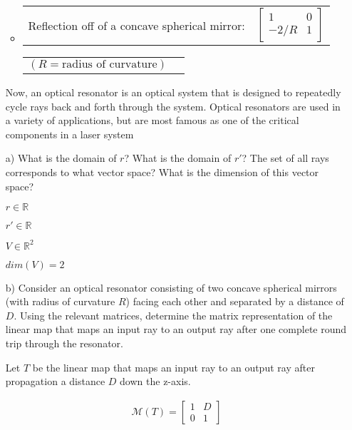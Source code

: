 \documentclass[fleqn]{article}
\begin{document}
\begin{enumerate}[nolistsep]
\begin{itemize}
				\item
					\begin{tabularx}{0.85\textwidth}{>{\hsize=0.75\hsize}X  >{\hsize=0.25\hsize}X}
						Reflection off of a concave spherical mirror: & $\begin{bmatrix}
							 1   & 0\\
							-2/R & 1
							\end{bmatrix}$
					\end{tabularx}
					
					\begin{tabularx}{0.85\textwidth}{>{\hsize=0.75\hsize}X  >{\hsize=0.25\hsize}X}
						$(R = \text{radius of curvature})$ &\\						
					\end{tabularx}
			\end{itemize}
			\endgroup
				
			Now, an optical resonator is an optical system that is designed to repeatedly cycle rays back and forth through the system. Optical resonators are used in a variety of applications, but are most famous as one of the critical components in a laser system
			
			\item[a)] What is the domain of $r$? What is the domain of $r'$? The set of all rays corresponds to what vector space? What is the dimension of this vector space?
			
			$r \in \mathbb{R}$
			
			$r' \in \mathbb{R}$
			
			$V \in \mathbb{R}^2$
			
			$dim(V) = 2$
			
			\item[b)] Consider an optical resonator consisting of two concave spherical mirrors (with radius of curvature $R$) facing each other and separated by a distance of $D$. Using the relevant matrices, determine the matrix representation of the linear map that maps an input ray to an output ray after one complete round trip through the resonator.
			
			\pagebreak
			Let $T$ be the linear map that maps an input ray to an output ray after propagation a distance $D$ down the z-axis.
			
			\begin{align*}
				\mathcal{M}(T) = \begin{bmatrix}1 & D\\ 0 & 1\end{bmatrix}
			\end{align*}
			

\end{enumerate}
\end{document}
